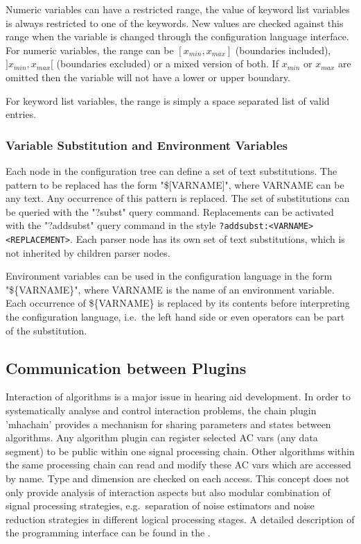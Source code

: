 Numeric variables can have a restricted range, the value of keyword list 
variables is always restricted to one of the keywords. New values are checked 
against this range when the variable is changed through the \mha{} configuration 
language interface. For numeric variables, the range can be 
$[x_{min},x_{max}]$ (boundaries included), $]x_{min},x_{max}[$
(boundaries excluded) or a mixed version of both. If $x_{min}$ or
$x_{max}$ are omitted then the variable will not have a lower or
upper boundary.

For keyword list variables, the range is simply a space separated list of valid
entries.

\subsubsection{Variable Substitution and Environment
  Variables}

Each node in the \mha{} configuration tree can define a set of text
substitutions.  The pattern to be replaced has the form "\$[VARNAME]",
where VARNAME can be any text. Any occurrence of this pattern is
replaced. The set of substitutions can be queried with the "?subst"
query command. Replacements can be activated with the "?addsubst"
query command in the style
\verb!?addsubst:<VARNAME> <REPLACEMENT>!. Each parser node has its own
set of text substitutions, which is not inherited by children parser
nodes.

Environment variables can be used in the \mha{} configuration language in the form
"\$\{VARNAME\}", where VARNAME is the name of an environment variable. Each
occurrence of \$\{VARNAME\} is replaced by its contents before interpreting the
\mha{} configuration language, i.e.\ the left hand side or even operators can be part of
the substitution.

\subsection{Communication between \mha{} Plugins}

Interaction of algorithms is a major issue in hearing aid
development. In order to systematically analyse and control
interaction problems, the \mha{} chain plugin 'mhachain' provides 
a mechanism for sharing parameters and states between algorithms. 
Any algorithm plugin can register selected AC vars (any data segment) to be public
within one signal processing chain. Other algorithms within the same 
processing chain can read and modify these AC vars which are accessed by name. Type and dimension are checked on each access. 
This concept does not only provide analysis of interaction aspects 
but also modular combination of signal processing strategies, 
e.g.\ separation of noise estimators and noise reduction strategies 
in different logical processing stages. A detailed description of 
the programming interface can be found in the \DeveloperManual.


